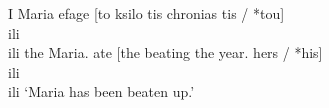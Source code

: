 \documentclass[output=paper,
modfonts
]{langscibook}
\begin{document}
\ili{}\gll\ili{} I\ili{} Maria\ili{} \ili{} \ili{} \ili{} \ili{} \ili{} \ili{} \ili{} \ili{} \ili{} \ili{} \ili{} \ili{} efage\ili{} \ili{} \ili{}[to\ili{} ksilo\ili{} \ili{} \ili{} \ili{} \ili{} \ili{} \ili{} \ili{} tis\ili{} \ili{} \ili{} \ili{} \ili{} chronias\ili{} \ili{} \ili{} \ili{} \ili{} \ili{} \ili{} tis\ili{} \ili{} \ili{} \ili{} \ili{}/\ili{} \ili{}*tou\ili{}]\ili{}\\ili{}\\ili{}
\ili{} \ili{} \ili{} \ili{} \ili{} \ili{} \ili{} \ili{} \ili{} \ili{} \ili{} the\ili{} Maria\ili{}.\ili{}\textsc{}\ili{} ate\ili{} \ili{} \ili{} \ili{} \ili{} \ili{} \ili{} \ili{}[the\ili{} beating\ili{} \ili{} the\ili{} \ili{} \ili{} \ili{} year\ili{}.\ili{}\textsc{}\ili{} \ili{} \ili{} \ili{} hers\ili{} \ili{} \ili{}/\ili{} \ili{}*his\ili{}]\ili{}\\ili{}\\ili{}
\ili{}\glt\ili{} \ili{}`Maria\ili{} has\ili{} been\ili{} beaten\ili{} up\ili{}.\ili{}'\ili{}
\ili{}\z\ili{}
\ili{}
\end{document}
